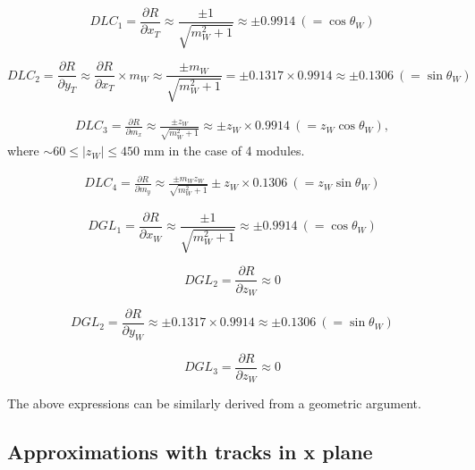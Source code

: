 \documentclass[a4paper,11pt]{article}
\begin{document}
\begin{equation}
DLC_1 = \frac{\partial R}{\partial x_T} \approx   \frac{\pm1}{\sqrt{m_W^2+1}} \approx \pm 0.9914 \ (= \cos\theta_W)
\end{equation}

\begin{equation}
DLC_2 = \frac{ \partial R}{\partial y_T} \approx   \frac{ \partial R}{\partial x_T} \times m_W \approx \frac{\pm m_W}{\sqrt{m_W^2+1}} = \pm 0.1317 \times 0.9914 \approx \pm 0.1306 \ (= \sin\theta_W)
\end{equation}


\begin{equation}
\begin{split}
DLC_3 = \frac{ \partial R}{\partial m_x} \approx \frac{\pm z_W}{\sqrt{m_W^2+1}} \approx \pm z_W \times 0.9914 \ (= z_W\cos\theta_W),
\end{split}
\end{equation}
where $ \sim 60 \leq |z_W| \leq 450$ mm in the case of 4 modules. 

\begin{equation}
\begin{split}
DLC_4 = \frac{ \partial R}{\partial m_y} \approx \frac{\pm m_W z_W}{\sqrt{m_W^2+1}} \pm z_W \times 0.1306 \ (= z_W\sin\theta_W)
\end{split}
\end{equation}


\begin{equation}	
DGL_1 = \frac{\partial R}{\partial x_W} \approx  \frac{\pm1}{\sqrt{m_W^2+1}} \approx \pm 0.9914 \ (= \cos\theta_W)
\end{equation}

\begin{equation}	
DGL_2 = \frac{\partial R}{\partial z_W} \approx  0
\end{equation}


\begin{equation}	
DGL_2 = \frac{\partial R}{\partial y_W} \approx \pm 0.1317 \times 0.9914 \approx \pm 0.1306 \ (= \sin\theta_W)
\end{equation}

\begin{equation}	
DGL_3 = \frac{\partial R}{\partial z_W} \approx  0
\end{equation}

The above expressions can be similarly derived from a geometric argument. 


\subsection{Approximations with tracks in x plane}
\end{document}
